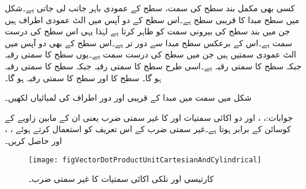 کسی بھی مکمل بند سطح کی  سمت، سطح کے عمودی باہر جانب لی جاتی ہے۔شکل  میں  سطح  مبدا کا قریبی سطح ہے۔اس سطح کے دو آپس میں الٹ عمودی اطراف  ہیں جن میں  بند سطح کی بیرونی سمت کو ظاہر کرتا ہے لہٰذا یہی اس سطح کی درست سمت ہے۔اس کے برعکس  سطح مبدا سے دور تر ہے۔اس سطح کے بھی دو آپس میں الٹ عمودی سمتیں  ہیں جن میں  سطح کی درست سمت ہے۔یوں   سطح کا سمتی رقبہ  جبکہ  سطح کا سمتی رقبہ  ہے۔اسی طرح  سطح کا سمتی رقبہ  جبکہ  سطح کا سمتی رقبہ ہو گا۔ سطح کا  اور  سطح کا سمتی رقبہ  ہو گا۔

شکل  میں  سمت میں مبدا کے قریبی اور دور اطراف کی لمبائیاں لکھیں۔

جوابات:، ،  اور 
دو اکائی سمتیات  اور  کا غیر سمتی ضرب  یعنی ان کے مابین زاویے  کے کوسائن کے برابر ہوتا ہے۔غیر سمتی ضرب کے اس تعریف کو استعمال کرتے ہوئے ، ،  اور  حاصل کریں۔
\begin{figure}
\centering
\texttt{[image: figVectorDotProductUnitCartesianAndCylindrical]}
\caption{کارتیسی اور نلکی اکائی سمتیات کا غیر سمتی ضرب۔}
\label{شکل_سمتیہ_غیر_سمتی_ضرب_بذریعہ_تعریف}
\end{figure}

